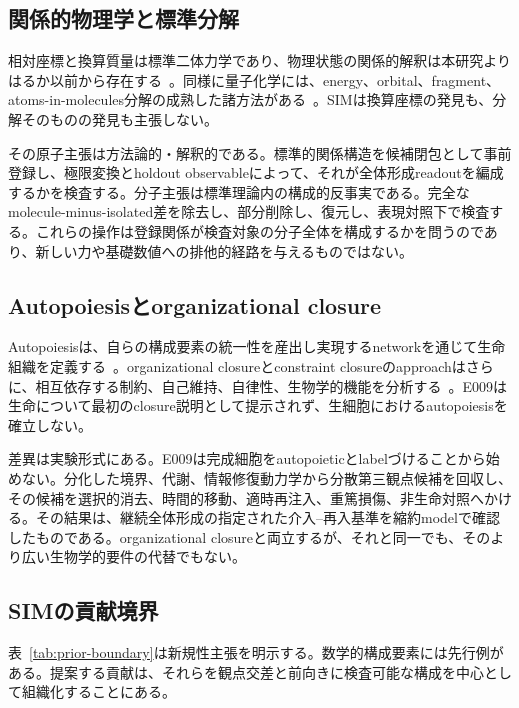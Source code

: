 \documentclass[11pt,a4paper]{article}
\begin{document}
\subsection{関係的物理学と標準分解}

相対座標と換算質量は標準二体力学であり、物理状態の関係的解釈は本研究よりはるか以前から存在する~\cite{landau1977,rovelli1996}。同様に量子化学には、energy、orbital、fragment、atoms-in-molecules分解の成熟した諸方法がある~\cite{morokuma1971,kitaura1976,bickelhaupt2000,stone2013}。SIMは換算座標の発見も、分解そのものの発見も主張しない。

その原子主張は方法論的・解釈的である。標準的関係構造を候補閉包として事前登録し、極限変換とholdout observableによって、それが全体形成readoutを編成するかを検査する。分子主張は標準理論内の構成的反事実である。完全なmolecule-minus-isolated差を除去し、部分削除し、復元し、表現対照下で検査する。これらの操作は登録関係が検査対象の分子全体を構成するかを問うのであり、新しい力や基礎数値への排他的経路を与えるものではない。

\subsection{Autopoiesisとorganizational closure}

Autopoiesisは、自らの構成要素の統一性を産出し実現するnetworkを通じて生命組織を定義する~\cite{varela1974,maturana1980}。organizational closureとconstraint closureのapproachはさらに、相互依存する制約、自己維持、自律性、生物学的機能を分析する~\cite{mossio2009,mossio2010,montevil2015,moreno2015}。E009は生命について最初のclosure説明として提示されず、生細胞におけるautopoiesisを確立しない。

差異は実験形式にある。E009は完成細胞をautopoieticとlabelづけることから始めない。分化した境界、代謝、情報修復動力学から分散第三観点候補を回収し、その候補を選択的消去、時間的移動、適時再注入、重篤損傷、非生命対照へかける。その結果は、継続全体形成の指定された介入--再入基準を縮約modelで確認したものである。organizational closureと両立するが、それと同一でも、そのより広い生物学的要件の代替でもない。

\subsection{SIMの貢献境界}

表~\ref{tab:prior-boundary}は新規性主張を明示する。数学的構成要素には先行例がある。提案する貢献は、それらを観点交差と前向きに検査可能な構成を中心として組織化することにある。
\end{document}
